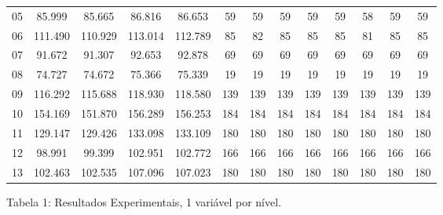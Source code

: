 \documentclass[12pt,a4paper]{article}
\begin{document}
\begin{adjustbox}{width={\textwidth}, totalheight={\textheight}, keepaspectratio}
\begin{tabular}{l cccc cccc cccc}
            05    & 85.999                                     & 85.665                          & 86.816                             & 86.653     & 59  & 59  & 59  & 59         & 59  & 58  & 59  & 59         \\
            06    & 111.490                                    & 110.929                         & 113.014                            & 112.789    & 85  & 82  & 85  & 85         & 85  & 81  & 85  & 85         \\
            07    & 91.672                                     & 91.307                          & 92.653                             & 92.878     & 69  & 69  & 69  & 69         & 69  & 69  & 69  & 69         \\
            08    & 74.727                                     & 74.672                          & 75.366                             & 75.339     & 19  & 19  & 19  & 19         & 19  & 19  & 19  & 19         \\
            09    & 116.292                                    & 115.688                         & 118.930                            & 118.580    & 139 & 139 & 139 & 139        & 139 & 139 & 139 & 139        \\
            10    & 154.169                                    & 151.870                         & 156.289                            & 156.253    & 184 & 184 & 184 & 184        & 184 & 184 & 184 & 184        \\
            11    & 129.147                                    & 129.426                         & 133.098                            & 133.109    & 180 & 180 & 180 & 180        & 180 & 180 & 180 & 180        \\
            12    & 98.991                                     & 99.399                          & 102.951                            & 102.772    & 166 & 166 & 166 & 166        & 166 & 166 & 166 & 166        \\
            13    & 102.463                                    & 102.535                         & 107.096                            & 107.023    & 180 & 180 & 180 & 180        & 180 & 180 & 180 & 180        \\
            \bottomrule
      \end{tabular}
\end{adjustbox}

\vspace*{0.5cm}

\begin{center}
      Tabela 1: Resultados Experimentais, 1 variável por nível.
\end{center}
\end{document}
